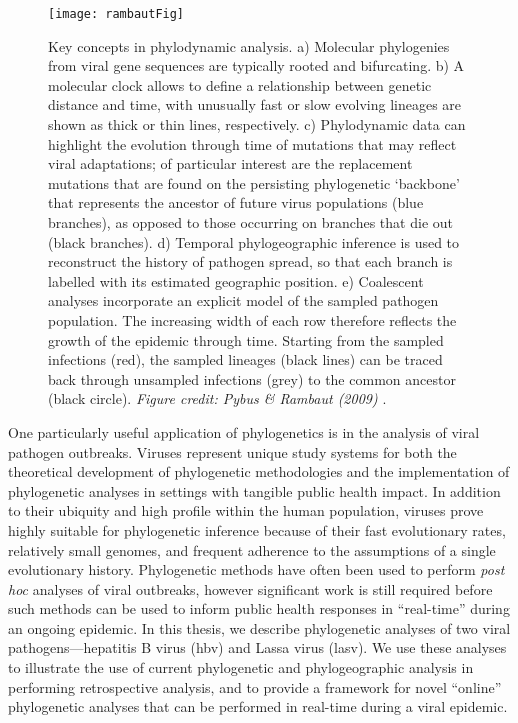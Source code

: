 \begin{figure}[ht]
  \centering
  \medskip
  \texttt{[image: rambautFig]}
  \caption[Applications of phylogenetic analysis]{Key concepts in phylodynamic analysis.
  a) Molecular phylogenies from viral gene sequences are typically rooted and bifurcating.
  b) A molecular clock allows to define a relationship between genetic distance and time, with unusually fast or slow evolving lineages are shown as thick or thin lines, respectively.
  c) Phylodynamic data can highlight the evolution through time of mutations that may reflect viral adaptations; of particular interest are the replacement mutations that are found on the persisting phylogenetic ‘backbone’ that represents the ancestor of future virus populations (blue branches), as opposed to those occurring on branches that die out (black branches).
  d) Temporal phylogeographic inference is used to reconstruct the history of pathogen spread, so that each branch is labelled with its estimated geographic position.
  e) Coalescent analyses incorporate an explicit model of the sampled pathogen population.
  The increasing width of each row therefore reflects the growth of the epidemic through time. Starting from the sampled infections (red), the sampled lineages (black lines) can be traced back through unsampled infections (grey) to the common ancestor (black circle).
  \textit{Figure credit: Pybus \& Rambaut (2009)} \cite{pybus2009evolutionary}.
  }
  \label{fig:phylogeneticsOverview}
\end{figure}

One particularly useful application of phylogenetics is in the analysis of viral pathogen outbreaks.
Viruses represent unique study systems for both the theoretical development of phylogenetic methodologies and the implementation of phylogenetic analyses in settings with tangible public health impact.
In addition to their ubiquity and high profile within the human population, viruses prove highly suitable for phylogenetic inference because of their fast evolutionary rates, relatively small genomes, and frequent adherence to the assumptions of a single evolutionary history.
Phylogenetic methods have often been used to perform \textit{post hoc} analyses of viral outbreaks, however significant work is still required before such methods can be used to inform public health responses in ``real-time'' during an ongoing epidemic.
In this thesis, we describe phylogenetic analyses of two viral pathogens---hepatitis B virus (\gls{hbv}) and Lassa virus (\gls{lasv}).
We use these analyses to illustrate the use of current phylogenetic and phylogeographic analysis in performing retrospective analysis, and to provide a framework for novel ``online'' phylogenetic analyses that can be performed in real-time during a viral epidemic.

